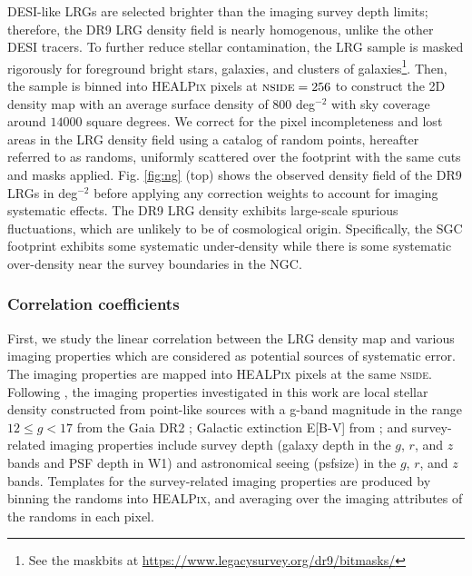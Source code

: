 DESI-like LRGs are selected brighter than the imaging survey depth limits; therefore, the DR9 LRG density field is nearly homogenous, unlike the other DESI tracers. To further reduce stellar contamination, the LRG sample is masked rigorously for foreground bright stars, galaxies, and clusters of galaxies\footnote{See the maskbits at \url{https://www.legacysurvey.org/dr9/bitmasks/}}. Then, the sample is binned into \textsc{HEALPix} \citep{gorski2005healpix} pixels at $\textsc{nside}=256$ to construct the 2D density map with an average surface density of $800$ deg$^{-2}$ with sky coverage around $14000$ square degrees. We correct for the pixel incompleteness and lost areas in the LRG density field using a catalog of random points, hereafter referred to as randoms, uniformly scattered over the footprint with the same cuts and masks applied. Fig. \ref{fig:ng} (top) shows the observed density field of the DR9 LRGs in deg$^{-2}$ before applying any correction weights to account for imaging systematic effects. The DR9 LRG density exhibits large-scale spurious fluctuations, which are unlikely to be of cosmological origin. Specifically, the SGC footprint exhibits some systematic under-density while there is some systematic over-density near the survey boundaries in the NGC. 

\subsubsection{Correlation coefficients}
First, we study the linear correlation between the LRG density map and various imaging properties which are considered as potential sources of systematic error. The imaging properties are mapped into \textsc{HEALPix} pixels at the same \textsc{nside}. Following \cite{zhou2022target}, the imaging properties investigated in this work are local stellar density constructed from point-like sources with a g-band magnitude in the range $12 \leq g < 17$ from the Gaia DR2 \citep[see,][]{gaiadr2, myers2022}; Galactic extinction E[B-V] from \cite{schlegel1998maps}; and survey-related imaging properties include survey depth (galaxy depth in the $g$, $r$, and $z$ bands and PSF depth in W1) and astronomical seeing (psfsize) in the $g$, $r$, and $z$ bands. Templates for the survey-related imaging properties are produced by binning the randoms into \textsc{HEALPix},  and averaging over the imaging attributes of the randoms in each pixel. 

